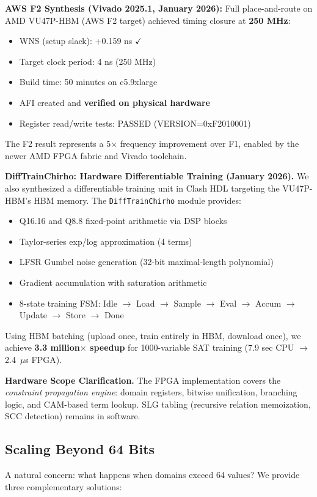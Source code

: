 \documentclass[11pt,a4paper]{article}
\begin{document}
\textbf{AWS F2 Synthesis (Vivado 2025.1, January 2026):}
Full place-and-route on AMD VU47P-HBM (AWS F2 target) achieved timing closure at \textbf{250 MHz}:
\begin{itemize}
  \item WNS (setup slack): +0.159 ns $\checkmark$
  \item Target clock period: 4 ns (250 MHz)
  \item Build time: 50 minutes on c5.9xlarge
  \item AFI created and \textbf{verified on physical hardware}
  \item Register read/write tests: PASSED (VERSION=0xF2010001)
\end{itemize}
The F2 result represents a 5$\times$ frequency improvement over F1, enabled by the newer AMD FPGA fabric and Vivado toolchain.

\textbf{DiffTrainChirho: Hardware Differentiable Training (January 2026).}
We also synthesized a differentiable training unit in Clash HDL targeting the VU47P-HBM's HBM memory.
The \texttt{DiffTrainChirho} module provides:
\begin{itemize}
  \item Q16.16 and Q8.8 fixed-point arithmetic via DSP blocks
  \item Taylor-series exp/log approximation (4 terms)
  \item LFSR Gumbel noise generation (32-bit maximal-length polynomial)
  \item Gradient accumulation with saturation arithmetic
  \item 8-state training FSM: Idle $\to$ Load $\to$ Sample $\to$ Eval $\to$ Accum $\to$ Update $\to$ Store $\to$ Done
\end{itemize}
Using HBM batching (upload once, train entirely in HBM, download once), we achieve
\textbf{3.3 million$\times$ speedup} for 1000-variable SAT training (7.9 sec CPU $\to$ 2.4~$\mu$s FPGA).

\textbf{Hardware Scope Clarification.}
The FPGA implementation covers the \emph{constraint propagation engine}: domain registers, bitwise unification, branching logic, and CAM-based term lookup.
SLG tabling (recursive relation memoization, SCC detection) remains in software.

\subsection{Scaling Beyond 64 Bits}

A natural concern: what happens when domains exceed 64 values?
We provide three complementary solutions:
\end{document}
